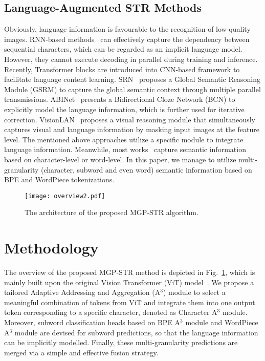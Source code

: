 \documentclass[runningheads]{llncs}
\begin{document}
\subsection{Language-Augmented STR Methods}

Obviously, language information is favourable to the recognition of low-quality images.
RNN-based methods~\cite{CRNN,rnn1,GCRNN}  can effectively capture the dependency between sequential characters, which can be regarded as an implicit language model. 
However, they cannot execute decoding in parallel during training and inference.
Recently, Transformer blocks are introduced into CNN-based framework to facilitate language content learning. 
SRN~\cite{SRN} proposes a Global Semantic Reasoning Module (GSRM) to capture the global semantic context through multiple parallel transmissions.
ABINet~\cite{ABInet} presents a Bidirectional Cloze Network (BCN) to explicitly model the language information, which is further used for iterative correction.
VisionLAN~\cite{vlan} proposes a visual reasoning module that simultaneously captures visual and language information by masking input images at the feature level. 
The mentioned above approaches utilize a specific module to integrate language information.
Meanwhile, most works~\cite{MJ1,ABInet} capture semantic information based on character-level or word-level.
In this paper, we manage to utilize multi-granularity (character, subword and even word) semantic information based on BPE and WordPiece tokenizations.

\begin{figure}[t]\centering
 \texttt{[image: overview2.pdf]}
 \caption{The architecture of the proposed MGP-STR algorithm. }
 \label{fig:overview}
\end{figure}

\section{Methodology}

The overview of the proposed MGP-STR method is depicted in Fig.~\ref{fig:overview}, which is mainly built upon the original Vision Transformer (ViT) model~\cite{dosovitskiy2020image}. We propose a tailored Adaptive Addressing and Aggregation (A$^3$) module to select a meaningful combination of tokens from ViT and integrate them into one output token corresponding to a specific character, denoted as Character A$^3$ module.
Moreover, subword classification heads based on BPE A$^3$ module and WordPiece A$^3$ module are devised for subword predictions, so that the language information can be implicitly modelled. 
Finally, these multi-granularity predictions are merged via a simple and effective fusion strategy. 
\end{document}
